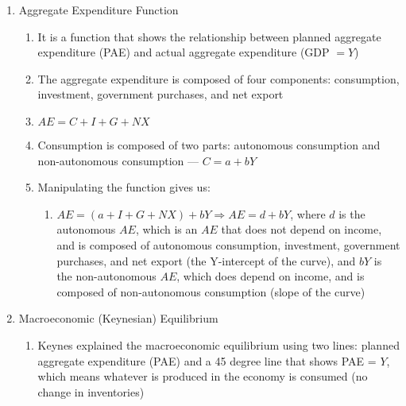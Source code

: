 \documentclass[12pt]{article}
\begin{document}
\begin{enumerate}
\begin{enumerate}
        \end{enumerate}

      \item Aggregate Expenditure Function

        \begin{enumerate}

          \item It is a function that shows the relationship between planned aggregate expenditure (PAE) and actual aggregate expenditure (GDP $=Y$)

          \item The aggregate expenditure is composed of four components: consumption, investment, government purchases, and net export

          \item $AE=C+I+G+NX$

          \item Consumption is composed of two parts: autonomous consumption and non-autonomous consumption — $C=a+bY$

          \item Manipulating the function gives us:

            \begin{enumerate}

              \item $AE = (a + I + G + NX) + bY\Rightarrow AE = d + bY$, where $d$ is the autonomous $AE$, which is an $AE$ that does not depend on income, and is composed of autonomous consumption, investment, government purchases, and net export (the Y-intercept of the curve), and $bY$ is the non-autonomous $AE$, which does depend on income, and is composed of non-autonomous consumption (slope of the curve)

            \end{enumerate}

        \end{enumerate}

      \item Macroeconomic (Keynesian) Equilibrium

        \begin{enumerate}

          \item Keynes explained the macroeconomic equilibrium using two lines: planned aggregate expenditure (PAE) and a 45 degree line that shows PAE = $Y$, which means whatever is produced in the economy is consumed (no change in inventories)


\end{enumerate}
\end{enumerate}
\end{document}
